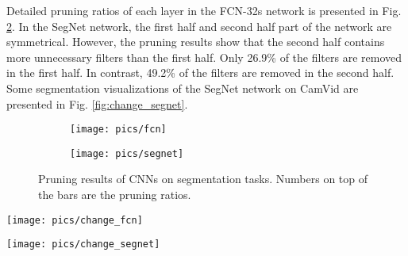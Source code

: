 \documentclass[10pt,twocolumn,letterpaper]{article}
\begin{document}
Detailed pruning ratios of each layer in the FCN-32s network is presented in Fig. \ref{fig:ratio_segnet}. In the SegNet network, the first half and second half part of the network are symmetrical. However, the pruning results show that the second half contains more unnecessary filters than the first half. Only 26.9\% of the filters are removed in the first half. In contrast, 49.2\% of the filters are removed in the second half. Some segmentation visualizations of the SegNet network on CamVid are presented in Fig. \ref{fig:change_segnet}.

\begin{figure}[h]
  \centering
  \captionsetup{justification=centering}
  \begin{subfigure}{.5\textwidth}
  \centering
  \texttt{[image: pics/fcn]}
  \label{fig:ratio_fcn}
\end{subfigure}%
\hfill
\begin{subfigure}{.5\textwidth}
  \centering
  \texttt{[image: pics/segnet]}
  \label{fig:ratio_segnet}
\end{subfigure}%
\caption{ Pruning results of CNNs on segmentation tasks. Numbers on top of the bars are the pruning ratios.}
\label{fig:segmentation}
\end{figure}




\begin{figure*}
\begin{center}
   \texttt{[image: pics/change\_fcn]}
\end{center}
   \caption{Segmentation visualization of the FCN-32s network on Pascal VOC. The number in each column represents the change of global accuracy. The first two, middle two, and last two columns are samples with global accuracies increased, unchanged, and decreased, respectively.}
\label{fig:change_fcn}
\end{figure*}

\begin{figure*}
  \centering
  \captionsetup{justification=centering}
  
  \texttt{[image: pics/change\_segnet]}

\caption{Segmentation visualization of the SegNet network on CamVid. The number in each column represents the change of global accuracy. The first two, middle two, and last two columns are samples with global accuracies increased, unchanged, and decreased, respectively.}
\label{fig:change_segnet}
\end{figure*}
\end{document}
